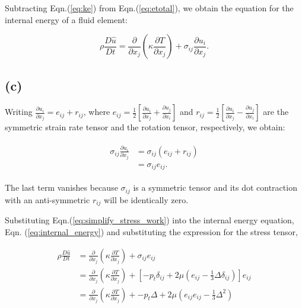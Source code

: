 \documentclass{article}
\begin{document}
Subtracting Eqn.(\ref{eq:ke}) from Eqn.(\ref{eq:etotal}), we obtain the equation for the internal energy of a fluid element:

\begin{equation}\label{eq:internal_energy}
\boxed {\rho \frac{D\hat{u}}{Dt} =  \frac{\partial}{\partial x_{j}}\left( \kappa \frac{\partial T}{\partial x_{j}} \right) + \sigma_{ij} \frac{\partial u_{i}}{\partial x_{j}} }.
\end{equation}
\subsection*{(c)}
Writing $\frac{\partial u_{i}}{\partial x_{j}} = e_{ij} + r_{ij}$, where $e_{ij} = \frac{1}{2}\left[\frac{\partial u_{i}}{\partial x_{j}} + \frac{\partial u_{j}}{\partial x_{i}} \right]$ and $r_{ij} = \frac{1}{2}\left[\frac{\partial u_{i}}{\partial x_{j}} - \frac{\partial u_{j}}{\partial x_{i}} \right]$ are the symmetric strain rate tensor and the rotation tensor, respectively, we obtain:

\begin{align}\label{eq:simplify_stress_work}
 \begin{split}
  \sigma_{ij} \frac{\partial u_{i}}{\partial x_{j}} &= \sigma_{ij} (e_{ij} + r_{ij})\\
  & = \sigma_{ij} e_{ij}.
 \end{split}
\end{align}

The last term vanishes because $\sigma_{ij}$ is a symmetric tensor and its dot contraction with an anti-symmetric $r_{ij}$ will be identically zero.

Substituting Eqn.(\ref{eq:simplify_stress_work}) into the internal energy equation, Eqn. (\ref{eq:internal_energy}) and substituting the expression for the stress tensor,

\begin{align}\label{eq:internal_energy_2}
 \rho \frac{D\hat{u}}{Dt} &=\frac{\partial}{\partial x_{j}}\left( \kappa \frac{\partial T}{\partial x_{j}} \right) + \sigma_{ij} e_{ij} \\
 & = \frac{\partial}{\partial x_{j}}\left( \kappa \frac{\partial T}{\partial x_{j}} \right) + \left[ -p_{t} \delta_{ij} + 2 \mu \left(e_{ij} - \frac{1}{3} \Delta \delta_{ij} \right) \right]e_{ij}\\
 &= \frac{\partial}{\partial x_{j}}\left( \kappa \frac{\partial T}{\partial x_{j}} \right) + -p_{t} \Delta + 2\mu \left(e_{ij}e_{ij} - \frac{1}{3}\Delta^{2} \right)
\end{align}
\end{document}
